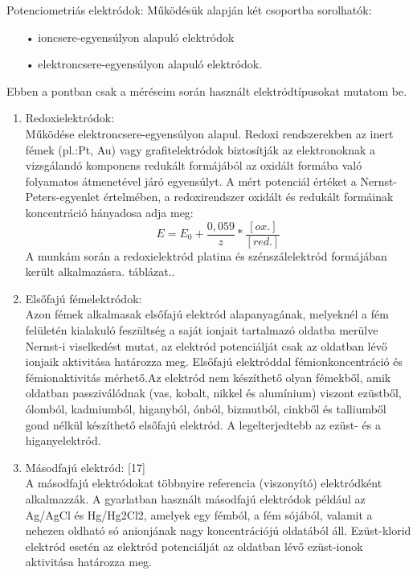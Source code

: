 Potenciometriás elektródok:
Működésük alapján két csoportba sorolhatók:
\begin{itemize}
\item[•]ioncsere-egyensúlyon alapuló elektródok
\item[•]elektroncsere-egyensúlyon alapuló elektródok.
\end{itemize} 

Ebben a pontban csak a méréseim során használt elektródtípusokat mutatom be.
\begin{enumerate}
\item Redoxielektródok:\\
Működése elektroncsere-egyensúlyon alapul. Redoxi rendszerekben az inert fémek (pl.:Pt, Au) vagy grafitelektródok biztosítják az elektronoknak a vizsgálandó komponens redukált formájából az oxidált formába való folyamatos átmenetével járó egyensúlyt. A mért potenciál értéket a Nernst-Peters-egyenlet értelmében, a redoxirendszer oxidált és redukált formáinak koncentráció hányadosa adja meg:
\begin{equation}
E= E_\text{0} + \frac{0,059}{z} * \frac{[ox.]}{[red.]}
\end{equation}
A munkám során a redoxielektród platina és szénszálelektród formájában került alkalmazásra.
táblázat..
\item Elsőfajú fémelektródok:\\
Azon fémek alkalmasak elsőfajú elektród alapanyagának, melyeknél a  fém felületén kialakuló feszültség a saját ionjait tartalmazó oldatba merülve Nernst-i viselkedést mutat, az elektród potenciálját csak az oldatban lévő ionjaik aktivitása határozza meg. Elsőfajú elektróddal fémionkoncentráció és fémionaktivitás mérhető.Az elektród nem készíthető olyan fémekből, amik oldatban passziválódnak (vas, kobalt, nikkel és alumínium) viszont ezüstből, ólomból, kadmiumból, higanyból, ónból, bizmutból, cinkből és talliumből gond nélkül készíthető elsőfajú elektród. A legelterjedtebb az ezüst- és a higanyelektród.
\item Másodfajú elektród: [17]\\
A másodfajú elektródokat többnyire referencia (viszonyító) elektródként alkalmazzák. A gyarlatban használt másodfajú elektródok például az Ag/AgCl és Hg/Hg2Cl2, amelyek egy fémból, a fém sójából, valamit a nehezen oldható só anionjának nagy koncentrációjú oldatából áll. Ezüst-klorid elektród esetén az elektród potenciálját az oldatban lévő ezüst-ionok aktivitása határozza meg.\\


\end{enumerate}
